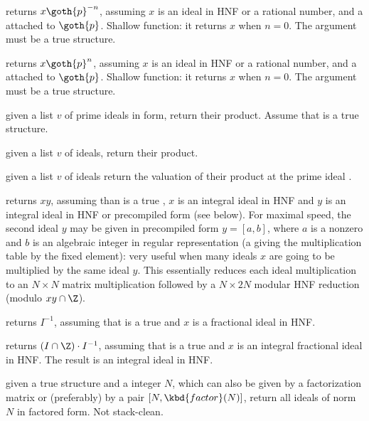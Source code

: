  returns $x
\goth{p}^{-n}$, assuming $x$ is an ideal in HNF or a rational number, and
 a  attached to $\goth{p}$. Shallow function:
it returns $x$ when $n = 0$. The  argument must be a true 
structure.

 returns $x
\goth{p}^{n}$, assuming $x$ is an ideal in HNF or a rational number, and
 a  attached to $\goth{p}$. Shallow function:
it returns $x$ when $n = 0$. The  argument must be a true 
structure.

 given a list $v$ of prime ideals
in  form, return their product. Assume that  is a true
 structure.

 given a list $v$ of ideals,
return their product.

 given a list $v$ of ideals
return the valuation of their product at the prime ideal .

 returns $xy$, assuming
than  is a true , $x$ is an integral ideal in HNF and $y$
is an integral ideal in HNF or precompiled form (see below).
For maximal speed, the second ideal $y$ may be given in precompiled form $y =
[a,b]$, where $a$ is a nonzero  and $b$ is an algebraic integer in
regular representation (a  giving the multiplication table by the
fixed element): very useful when many ideals $x$ are going to be multiplied by
the same ideal $y$. This essentially reduces each ideal multiplication to
an $N\times N$ matrix multiplication followed by a $N\times 2N$ modular
HNF reduction (modulo $xy\cap \Z$).

 returns $I^{-1}$, assuming that
 is a true  and $x$ is a fractional ideal in HNF.

 returns $(I\cap \Z) \cdot I^{-1}$,
assuming that  is a true  and $x$ is an integral fractional
ideal in HNF. The result is an integral ideal in HNF.

 given a true  structure and a
integer $N$, which can also be given by a factorization matrix or (preferably)
by a pair $[N, \kbd{factor}(N)]$, return all ideals of norm $N$ in factored
form. Not stack-clean.

